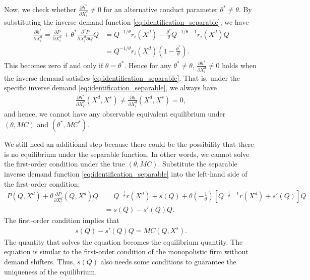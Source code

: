 \documentclass[11pt, a4paper]{article}
\theoremstyle{remark}
\begin{document}
Now, we check whether $\frac{\partial h^{*}}{\partial X_{i}^{d}} \ne 0$ for an alternative conduct parameter $\theta^{*} \ne \theta$.
By substituting the inverse demand function \eqref{eq:identification_separable}, we have
\begin{align}
    \frac{\partial h^{*}}{\partial X_{i}^d} = \frac{\partial P}{\partial X^{d}_{i}} + \theta^{*} \frac{\partial^2 P}{\partial X^{d}_{i}\partial Q}Q  &= Q^{-1/\theta} r_i(X^d) - \frac{\theta^{*}}{\theta} Q^{-1/\theta-1} r_i(X^d) Q\\
    &= Q^{-1/\theta} r_i(X^d) \left(1 - \frac{\theta^{*}}{\theta} \right).
\end{align}
This becomes zero if and only if $\theta= \theta^{*}$.
Hence for any $\theta^{*} \ne \theta$, $\frac{\partial h^{*}}{\partial X_{i}^{d}} \ne 0$ holds when the inverse demand satisfies \eqref{eq:identification_separable}.
That is, under the specific inverse demand \eqref{eq:identification_separable}, we always have 
\begin{align}
    \frac{\partial h^{*}}{\partial X^{d}_{i}}(X^{d}, X^{s}) \ne \frac{\partial h}{\partial X^{d}_{i}}(X^{d}, X^{s}) = 0,
\end{align}
and hence, we cannot have any observable equivalent equilibrium under $(\theta, MC)$ and $(\theta^{*}, MC^{*})$.


We still need an additional step because there could be the possibility that there is no equilibrium under the separable function.
In other words, we cannot solve the first-order condition under the true $(\theta, MC)$.
Substitute the separable inverse demand function \eqref{eq:identification_separable} into the left-hand side of the first-order condition;
\begin{align}
    P(Q, X^{d}) + \theta \frac{\partial P}{\partial X_i^{d}} (Q, X^{d}) Q & =  Q^{-\frac{1}{\theta}} r(X^{d}) + s(Q) + \theta \left(-\frac{1}{\theta}\right) \left[  Q^{-\frac{1}{\theta} -1} r(X^{d}) + s'(Q)\right]Q\\
    & = s(Q) - s'(Q)Q.
\end{align}
The first-order condition implies that
\begin{align}
    s(Q) - s'(Q)Q = MC(Q, X^{s}).
\end{align}
The quantity that solves the equation becomes the equilibrium quantity.
The equation is similar to the first-order condition of the monopolistic firm without demand shifters.
Thus, $s(Q)$ also needs some conditions to guarantee the uniqueness of the equilibrium.
\end{document}
